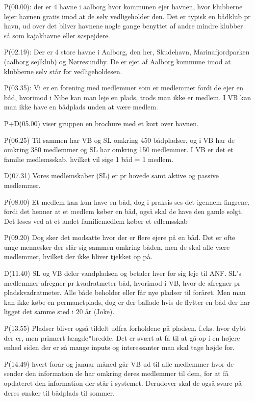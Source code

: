 P(00.00): der er 4 havne i aalborg hvor kommunen ejer havnen, hvor klubberne lejer havnen gratis imod at de selv vedligeholder den. Det er typisk en bådklub pr havn, ud over det bliver havnene nogle gange benyttet af andre mindre klubber så som kajakhavne eller søspejdere.

P(02.19): Der er 4 store havne i Aalborg, den her, Skudehavn, Marinafjordparken (aalborg sejlklub) og Nørresundby. De er ejet af Aalborg kommune imod at klubberne selv står for vedligeholdesen.

P(03.35): Vi er en forening med medlemmer som er medlemmer fordi de ejer en båd, hvorimod i Nibe kan man leje en plads, trods man ikke er medlem. I VB kan man ikke have en bådplads unden at være medlem.

P+D(05.00) viser gruppen en brochure med et kort over havnen.

P(06.25) Til sammen har VB og SL omkring 450 bådpladser, og i VB har de omkring 380 medlemmer og SL har omkring 150 medlemmer. I VB er det et familie medlemsskab, hvilket vil sige 1 båd = 1 medlem. 

D(07.31) Vores medlemskaber (SL) 	er pr hovede samt aktive og passive medlemmer.

P(08.00) Et medlem kan kun have en båd, dog i praksis ses det igennem fingrene, fordi det henner at et medlem køber en båd, også skal de have den gamle solgt. Det løses ved at et andet familiemedlem køber et edlemsskab

P(09.20) Dog sker det modsatte hvor der er flere ejere på en båd. Det er ofte unge mennesker der slår sig sammen omkring båden, men de skal alle være medlemmer, hvilket der ikke bliver tjekket op på.

D(11.40) SL og VB deler vandpladsen og betaler hver for sig leje til ANF. SL's medlemmer afregner pr kvadratmeter båd, hvorimod i VB, hvor de afregner pr pladskvadratmeter. Alle både beholder eller får nye pladser til foråret. Men man kan ikke købe en permanetplads, dog er der ballade hvis de flytter en båd der har ligget det samme sted i 20 år (Joke).

P(13.55) Pladser bliver også tildelt udfra forholdene på pladsen, f.eks. hvor dybt der er, men primært længde*bredde. Det er svært at få til at gå op i en højere enhed siden der er så mange inputs og interessanter man skal tage højde for.

P(14.49) hvert forår og januar måned går VB ud til alle medlemmer hvor de sender den information de har omkring deres medlemmer til dem, for at få opdateret den information der står i systemet. Derudover skal de også svare på deres ønsker til bådplads til sommer.	

